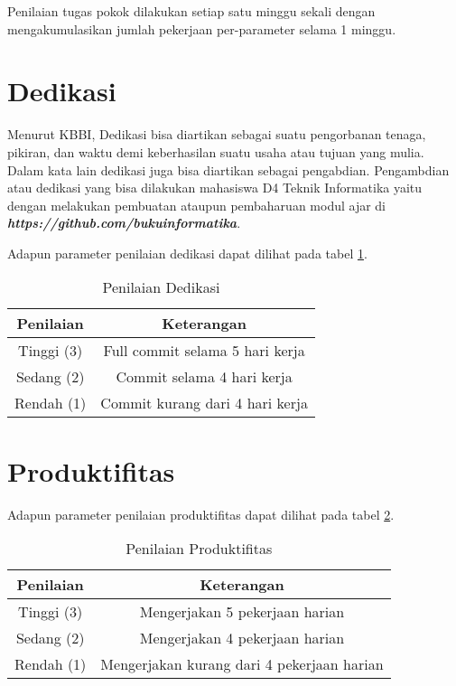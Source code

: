 Penilaian tugas pokok dilakukan setiap satu minggu sekali dengan mengakumulasikan jumlah pekerjaan per-parameter selama 1 minggu.

\section{Dedikasi}

Menurut KBBI, Dedikasi bisa diartikan sebagai suatu pengorbanan tenaga, pikiran, dan waktu demi keberhasilan suatu usaha atau tujuan yang mulia. Dalam kata lain dedikasi juga bisa diartikan sebagai pengabdian. Pengambdian atau dedikasi yang bisa dilakukan mahasiswa D4 Teknik Informatika yaitu dengan melakukan pembuatan ataupun pembaharuan modul ajar di \textbf{\textit{https://github.com/bukuinformatika}}.

Adapun parameter penilaian dedikasi dapat dilihat pada tabel \ref{tab:nilaidedikasi}.

\begin{table}[h]
\caption{Penilaian Dedikasi}
\centering
\begin{tabular}{|c|c|}
\hline
Penilaian&Keterangan\\
\hline
Tinggi (3)&Full commit selama 5 hari kerja\\
\hline
Sedang (2)&Commit selama 4 hari kerja\\
\hline
Rendah (1)&Commit kurang dari 4 hari kerja\\
\hline
\end{tabular}
\label{tab:nilaidedikasi}
\end{table}

\section{Produktifitas}

Adapun parameter penilaian produktifitas dapat dilihat pada tabel \ref{tab:nilaiproduktifitas}.

\begin{table}[h]
\caption{Penilaian Produktifitas}
\centering
\begin{tabular}{|c|c|}
\hline
Penilaian&Keterangan\\
\hline
Tinggi (3)&Mengerjakan 5 pekerjaan harian\\
\hline
Sedang (2)&Mengerjakan 4 pekerjaan harian\\
\hline
Rendah (1)&Mengerjakan kurang dari 4 pekerjaan harian\\
\hline
\end{tabular}
\label{tab:nilaiproduktifitas}
\end{table}

